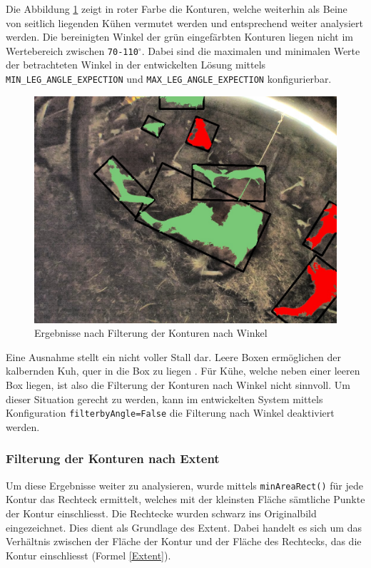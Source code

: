 Die Abbildung \ref{fig: Ergebnisse nach Filterung der Konturen nach Winkel} zeigt in roter Farbe die Konturen, welche weiterhin als Beine von seitlich liegenden Kühen vermutet werden und entsprechend weiter analysiert werden. Die bereinigten Winkel der grün eingefärbten Konturen liegen nicht im Wertebereich zwischen \texttt{70-}\texttt{110}$^{\circ}$. Dabei sind die maximalen und minimalen Werte der betrachteten Winkel in der entwickelten Lösung mittels \texttt{MIN_LEG_ANGLE_EXPECTION} und \texttt{MAX_LEG_ANGLE_EXPECTION} konfigurierbar. 
\begin{figure}[H]
	\center
	\includegraphics[scale=0.43]{Grafiken/entwicklung/22AngleCorrectur.jpg}
	\caption{Ergebnisse nach Filterung der Konturen nach Winkel} 
	\label{fig: Ergebnisse nach Filterung der Konturen nach Winkel} 
\end{figure}

Eine Ausnahme stellt ein nicht voller Stall dar. Leere Boxen ermöglichen der kalbernden Kuh, quer in die Box zu liegen \citep{Muller2020b}. Für Kühe, welche neben einer leeren Box liegen, ist also die Filterung der Konturen nach Winkel nicht sinnvoll. Um dieser Situation gerecht zu werden, kann im entwickelten System mittels Konfiguration \texttt{filterbyAngle=False} die Filterung nach Winkel deaktiviert werden. 


\subsubsection{Filterung der Konturen nach Extent}
Um diese Ergebnisse weiter zu analysieren, wurde mittels \texttt{minAreaRect()} für jede Kontur das Rechteck ermittelt, welches mit der kleinsten Fläche sämtliche Punkte der Kontur einschliesst. Die Rechtecke wurden schwarz ins Originalbild eingezeichnet. 
Dies dient als Grundlage des \flqq Extent\frqq. Dabei handelt es sich um das Verhältnis zwischen der Fläche der Kontur und der Fläche des Rechtecks, das die Kontur einschliesst (Formel \ref{Extent}).


